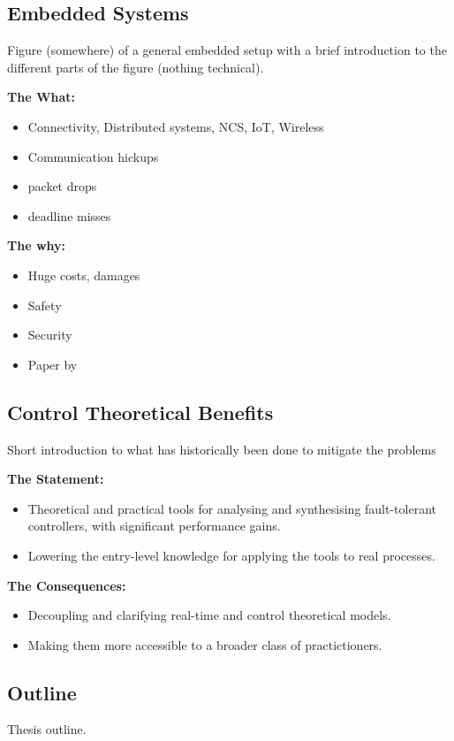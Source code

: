 {\subsection*{Embedded Systems}%
%
Figure (somewhere) of a general embedded setup with a brief introduction to the different
parts of the figure (nothing technical).

\textbf{The What:}
\begin{itemize}
    \item Connectivity, Distributed systems, NCS, IoT, Wireless
    \item Communication hickups
    \item packet drops
    \item deadline misses
\end{itemize}

\textbf{The why:}
\begin{itemize}
    \item Huge costs, damages
    \item Safety
    \item Security
    \item Paper by~\cite{Akesson:2020}
\end{itemize}

\subsection*{Control Theoretical Benefits}%
%
Short introduction to what has historically been done to mitigate the problems

\textbf{The Statement:}
\begin{itemize}
    \item Theoretical and practical tools for analysing and synthesising
        fault-tolerant controllers, with significant performance gains.
    \item Lowering the entry-level knowledge for applying the tools to real
        processes.
\end{itemize}

\textbf{The Consequences:}
\begin{itemize}
    \item Decoupling and clarifying real-time and control theoretical models.
    \item Making them more accessible to a broader class of practictioners.
\end{itemize}

\subsection*{Outline}%
%
Thesis outline.
}%
